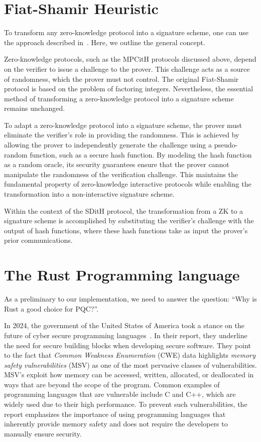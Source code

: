 \documentclass[11pt]{report}
\theoremstyle{definition}
\theoremstyle{plain}
\begin{document}
\section{Fiat-Shamir Heuristic}\label{sec:fiatshamir}
To transform any zero-knowledge protocol into a signature scheme, one can use the approach described in~\cite{fiat1986prove}. Here, we outline the general concept.

Zero-knowledge protocols, such as the MPCitH protocols discussed above, depend on the verifier to issue a challenge to the prover. This challenge acts as a source of randomness, which the prover must not control. The original Fiat-Shamir protocol is based on the problem of factoring integers. Nevertheless, the essential method of transforming a zero-knowledge protocol into a signature scheme remains unchanged.

To adapt a zero-knowledge protocol into a signature scheme, the prover must eliminate the verifier's role in providing the randomness. This is achieved by allowing the prover to independently generate the challenge using a pseudo-random function, such as a secure hash function. By modeling the hash function as a random oracle, its security guarantees ensure that the prover cannot manipulate the randomness of the verification challenge. This maintains the fundamental property of zero-knowledge interactive protocols while enabling the transformation into a non-interactive signature scheme.

Within the context of the SDitH protocol, the transformation from a ZK to a signature scheme is accomplished by substituting the verifier's challenge with the output of hash functions, where these hash functions take as input the prover's prior communications.

\section{The Rust Programming language}\label{sec:rust}
As a preliminary to our implementation, we need to answer the question: ``Why is Rust a good choice for PQC?''.

In 2024, the government of the United States of America took a stance on the future of cyber secure programming languages~\cite{whitehouse2024memorysafe}. In their report, they underline the need for secure building blocks when developing secure software. They point to the fact that \textit{Common Weakness Enumeration} (CWE) data highlights \textit{memory safety vulnerabilities} (MSV) as one of the most pervasive classes of vulnerabilities. MSV's exploit how memory can be accessed, written, allocated, or deallocated in ways that are beyond the scope of the program. Common examples of programming languages that are vulnerable include C and C++, which are widely used due to their high performance. To prevent such vulnerabilities, the report emphasizes the importance of using programming languages that inherently provide memory safety and does not require the developers to manually ensure security.
\end{document}
